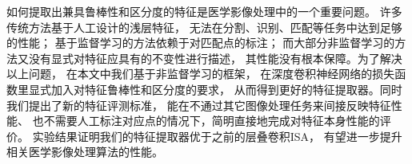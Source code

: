 如何提取出兼具鲁棒性和区分度的特征是医学影像处理中的一个重要问题。
许多传统方法基于人工设计的浅层特征，
无法在分割、识别、匹配等任务中达到足够的性能；
基于监督学习的方法依赖于对匹配点的标注；
而大部分非监督学习的方法又没有显式对特征应具有的不变性进行描述，
其性能没有根本保障。为了解决以上问题，
在本文中我们基于非监督学习的框架，
在深度卷积神经网络的损失函数里显式加入对特征鲁棒性和区分度的要求，
从而得到更好的特征提取器。同时我们提出了新的特征评测标准，
能在不通过其它图像处理任务来间接反映特征性能、
也不需要人工标注对应点的情况下，简明直接地完成对特征本身性能的评价。
实验结果证明我们的特征提取器优于之前的层叠卷积ISA，
有望进一步提升相关医学影像处理算法的性能。
